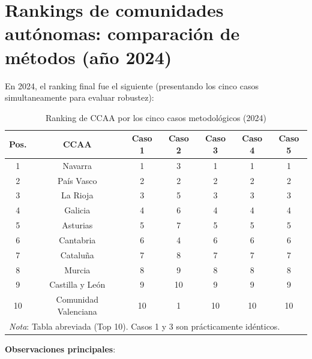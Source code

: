 \section{Rankings de comunidades autónomas: comparación de métodos (año 2024)}

En 2024, el ranking final fue el siguiente (presentando los cinco casos simultaneamente para evaluar robustez):

\begin{table}[H]
    \centering
    \small
    \begin{tabular}{ccccccc}
        \toprule
        \textbf{Pos.} & \textbf{CCAA} & \textbf{Caso 1} & \textbf{Caso 2} & \textbf{Caso 3} & \textbf{Caso 4} & \textbf{Caso 5} \\
        \midrule
        1 & Navarra & 1 & 3 & 1 & 1 & 1 \\
        2 & País Vasco & 2 & 2 & 2 & 2 & 2 \\
        3 & La Rioja & 3 & 5 & 3 & 3 & 3 \\
        4 & Galicia & 4 & 6 & 4 & 4 & 4 \\
        5 & Asturias & 5 & 7 & 5 & 5 & 5 \\
        6 & Cantabria & 6 & 4 & 6 & 6 & 6 \\
        7 & Cataluña & 7 & 8 & 7 & 7 & 7 \\
        8 & Murcia & 8 & 9 & 8 & 8 & 8 \\
        9 & Castilla y León & 9 & 10 & 9 & 9 & 9 \\
        10 & Comunidad Valenciana & 10 & 1 & 10 & 10 & 10 \\
        \midrule
        \multicolumn{7}{l}{\small \emph{Nota}: Tabla abreviada (Top 10). Casos 1 y 3 son prácticamente idénticos.} \\
        \bottomrule
    \end{tabular}
    \caption{Ranking de CCAA por los cinco casos metodológicos (2024)}
    \label{tab:ranking_ccaa_2024}
\end{table}

\textbf{Observaciones principales}:

